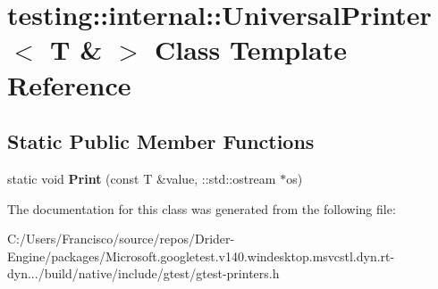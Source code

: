 \hypertarget{classtesting_1_1internal_1_1_universal_printer_3_01_t_01_6_01_4}{}\section{testing\+:\+:internal\+:\+:Universal\+Printer$<$ T \& $>$ Class Template Reference}
\label{classtesting_1_1internal_1_1_universal_printer_3_01_t_01_6_01_4}
\subsection*{Static Public Member Functions}
\begin{DoxyCompactItemize}
\item 
\mbox{\label{classtesting_1_1internal_1_1_universal_printer_3_01_t_01_6_01_4_a923a694be8aa66117848c1c5f57ede35}} 
static void {\bfseries Print} (const T \&value, \+::std\+::ostream $\ast$os)
\end{DoxyCompactItemize}


The documentation for this class was generated from the following file\+:\begin{DoxyCompactItemize}
\item 
C\+:/\+Users/\+Francisco/source/repos/\+Drider-\/\+Engine/packages/\+Microsoft.\+googletest.\+v140.\+windesktop.\+msvcstl.\+dyn.\+rt-\/dyn.../build/native/include/gtest/gtest-\/printers.\+h\end{DoxyCompactItemize}
